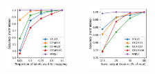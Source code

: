 \begin{figure}[t]
\begin{floatrow}
{\includegraphics[width=0.215\textwidth,trim=0 0 0 1em, clip]{experiments2_files/render_vary_num_labels_all.png}~~~%
\includegraphics[width=0.215\textwidth,trim=0 0 0 1em, clip]{experiments2_files/render_vary_num_clusters.png}
}
\end{floatrow}
\end{figure}
